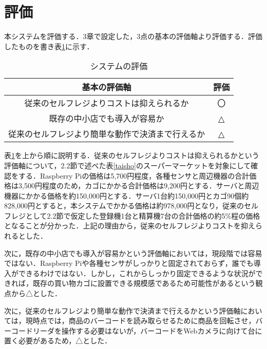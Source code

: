 

\section{評価}

本システムを評価する．3章で設定した，3点の基本の評価軸より評価する．評価したものを書き表\ref{hyouka}に示す．

\begin{table}[htb]
\begin{center}
\caption{システムの評価}
\begin{tabular}{|c|c|} \hline
基本の評価軸 & 評価 \\ \hline \hline
従来のセルフレジよりコストは抑えられるか & 〇 \\
既存の中小店でも導入が容易か & △ \\
従来のセルフレジより簡単な動作で決済まで行えるか & △\\ \hline
\end{tabular}
\label{hyouka}
\end{center}
\end{table}

表\ref{hyouka}を上から順に説明する．従来のセルフレジよりコストは抑えられるかという評価軸について，2.2節で述べた表\ref{taisho}のスーパーマーケットを対象にして確認をする．Raspberry Piの価格は5,700円程度，各種センサと周辺機器の合計価格は3,500円程度のため，カゴにかかる合計価格は9,200円とする．サーバと周辺機器にかかる価格を約150,000円とする．サーバ1台約150,000円とカゴ90個約828,000円とすると，本システムでかかる価格は約978,000円となり，従来のセルフレジとして2.2節で仮定した登録機1台と精算機7台の合計価格の約5\%程の価格となることが分かった．上記の理由から，従来のセルフレジよりコストを抑えられるとした．

次に，既存の中小店でも導入が容易かという評価軸においては，現段階では容易ではない．Raspberry Piや各種センサがしっかりと固定されておらず，誰でも導入ができるわけではない．しかし，これからしっかり固定できるような状況ができれば，既存の買い物カゴに設置できる規模感であるため可能性があるという観点から△とした．

次に，従来のセルフレジより簡単な動作で決済まで行えるかという評価軸においては，現時点では，商品のバーコードを読み取らせるために商品を回転させ，バーコードリーダを操作する必要はないが，バーコードをWebカメラに向けて台に置く必要があるため，△とした．